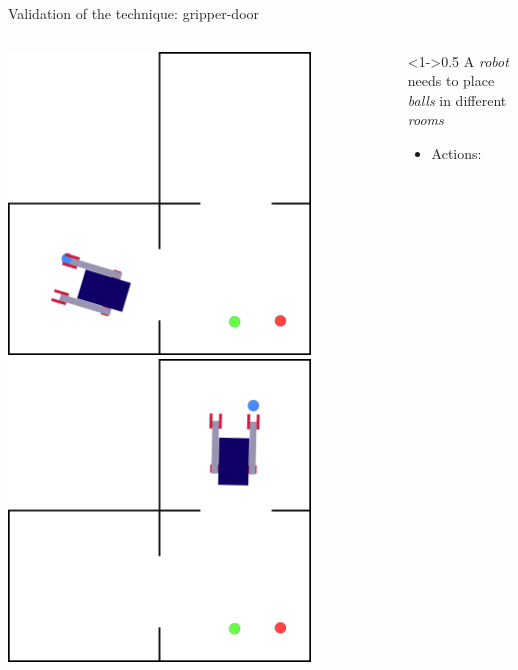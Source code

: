 \begin{frame}[c,fragile]{Validation of the technique: gripper-door}
\begin{columns}[T]
\begin{column}
\begin{overprint}
            \includegraphics[width = 0.8\textwidth]{images/3_rooms/gd_3_3.png}
            \includegraphics[width = 0.8\textwidth]{images/3_rooms/gd_3_6.png}
        \end{overprint}
    \end{column}
    \begin{column}<1->{0.5\textwidth}
        A \textit{robot} needs to place \textit{balls} in different \textit{rooms}
        \small
        \begin{itemize}
            \item Actions:

\end{itemize}
\end{column}
\end{columns}
\end{frame}
